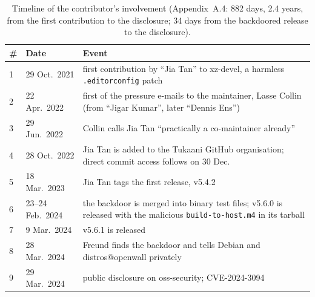 \documentclass[11pt,a4paper]{article}
\newcommand{\code}[1]{\texttt{#1}}
\begin{document}
\begin{table}[H]
\centering\small
\begin{tabular}{@{}llP{10.6cm}@{}}
\toprule
\# & Date & Event \\
 & 29 Oct.\ 2021 & first contribution by ``Jia Tan'' to xz-devel, a harmless \code{.editorconfig} patch \cite{cox} \\
2 & 22 Apr.\ 2022 & first of the pressure e-mails to the maintainer, Lasse Collin (from ``Jigar Kumar'', later ``Dennis Ens'') \cite{cox} \\
3 & 29 Jun.\ 2022 & Collin calls Jia Tan ``practically a co-maintainer already'' \cite{cox} \\
4 & 28 Oct.\ 2022 & Jia Tan is added to the Tukaani GitHub organisation; direct commit access follows on 30 Dec.\ \cite{cox} \\
5 & 18 Mar.\ 2023 & Jia Tan tags the first release, v5.4.2 \cite{cox} \\
6 & 23--24 Feb.\ 2024 & the backdoor is merged into binary test files; v5.6.0 is released with the malicious
\code{build-to-host.m4} in its tarball \cite{cox} \\
7 & 9 Mar.\ 2024 & v5.6.1 is released \cite{cox} \\
8 & 28 Mar.\ 2024 & Freund finds the backdoor and tells Debian and distros@openwall privately \cite{cox} \\
9 & 29 Mar.\ 2024 & public disclosure on oss-security; CVE-2024-3094 \cite{freund,nvd} \\
\bottomrule
\end{tabular}
\caption{Timeline of the contributor's involvement (Appendix~A.4: 882 days, 2.4 years, from the first contribution to the
disclosure; 34 days from the backdoored release to the disclosure).}\label{tab:xztime}
\end{table}
\end{document}
